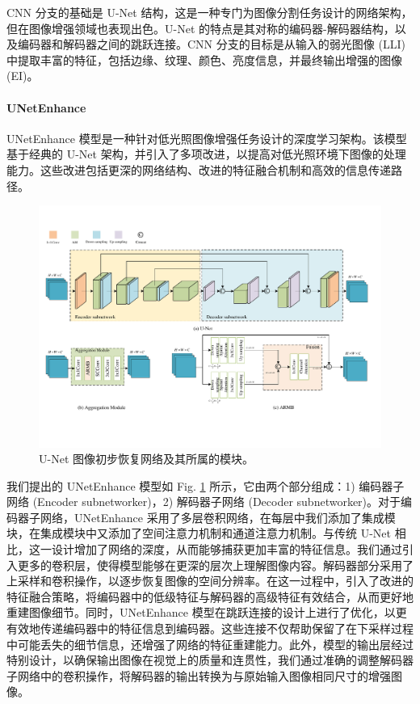 \documentclass[a4paper]{ctexart}
\begin{document}
	CNN 分支的基础是 U-Net 结构，这是一种专门为图像分割任务设计的网络架构，但在图像增强领域也表现出色。U-Net 的特点是其对称的编码器-解码器结构，以及编码器和解码器之间的跳跃连接。CNN 分支的目标是从输入的弱光图像 (LLI) 中提取丰富的特征，包括边缘、纹理、颜色、亮度信息，并最终输出增强的图像 (EI)。
	
	\paragraph{UNetEnhance}
	
	UNetEnhance 模型是一种针对低光照图像增强任务设计的深度学习架构。该模型基于经典的 U-Net 架构，并引入了多项改进，以提高对低光照环境下图像的处理能力。这些改进包括更深的网络结构、改进的特征融合机制和高效的信息传递路径。
	
	\begin{figure}[htb]
		\centering 
		\includegraphics[width=\columnwidth]{picture/LLIE/My Architecture/U-Net and AM}
		\caption{
			\label{fig: U-Net and AM} 
			U-Net 图像初步恢复网络及其所属的模块。
		}
	\end{figure}
	
	我们提出的 UNetEnhance 模型如 Fig. \ref{fig: U-Net and AM} 所示，它由两个部分组成：1) 编码器子网络 (Encoder subnetworker)，2) 解码器子网络 (Decoder subnetworker)。对于编码器子网络，UNetEnhance 采用了多层卷积网络，在每层中我们添加了集成模块，在集成模块中又添加了空间注意力机制和通道注意力机制\cite{woo2018cbam}。与传统 U-Net 相比，这一设计增加了网络的深度，从而能够捕获更加丰富的特征信息。我们通过引入更多的卷积层，使得模型能够在更深的层次上理解图像内容。解码器部分采用了上采样和卷积操作，以逐步恢复图像的空间分辨率。在这一过程中，引入了改进的特征融合策略，将编码器中的低级特征与解码器的高级特征有效结合，从而更好地重建图像细节。同时，UNetEnhance 模型在跳跃连接的设计上进行了优化，以更有效地传递编码器中的特征信息到编码器。这些连接不仅帮助保留了在下采样过程中可能丢失的细节信息，还增强了网络的特征重建能力。此外，模型的输出层经过特别设计，以确保输出图像在视觉上的质量和连贯性，我们通过准确的调整解码器子网络中的卷积操作，将解码器的输出转换为与原始输入图像相同尺寸的增强图像。
	
\end{document}
